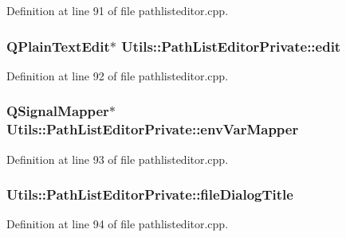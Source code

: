 \-Definition at line 91 of file pathlisteditor.\-cpp.

\hypertarget{struct_utils_1_1_path_list_editor_private_a31a2699dec0693dade54946d3793241e}{
\subsubsection[{edit}]{\setlength{\rightskip}{0pt plus 5cm}\-Q\-Plain\-Text\-Edit$\ast$ {\bf \-Utils\-::\-Path\-List\-Editor\-Private\-::edit}}}\label{struct_utils_1_1_path_list_editor_private_a31a2699dec0693dade54946d3793241e}


\-Definition at line 92 of file pathlisteditor.\-cpp.

\hypertarget{struct_utils_1_1_path_list_editor_private_a20a73b993eb36ec2ecd25527d274f962}{
\subsubsection[{env\-Var\-Mapper}]{\setlength{\rightskip}{0pt plus 5cm}\-Q\-Signal\-Mapper$\ast$ {\bf \-Utils\-::\-Path\-List\-Editor\-Private\-::env\-Var\-Mapper}}}\label{struct_utils_1_1_path_list_editor_private_a20a73b993eb36ec2ecd25527d274f962}


\-Definition at line 93 of file pathlisteditor.\-cpp.

\hypertarget{struct_utils_1_1_path_list_editor_private_a7f99e038e914397b7afcb6d35eff0142}{
\subsubsection[{file\-Dialog\-Title}]{ {\bf \-Utils\-::\-Path\-List\-Editor\-Private\-::file\-Dialog\-Title}}}\label{struct_utils_1_1_path_list_editor_private_a7f99e038e914397b7afcb6d35eff0142}


\-Definition at line 94 of file pathlisteditor.\-cpp.

